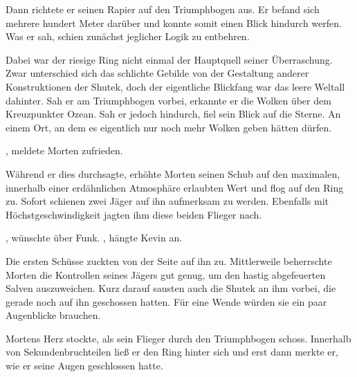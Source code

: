 Dann richtete er seinen Rapier auf den Triumphbogen aus. Er befand sich mehrere hundert Meter darüber und konnte somit einen Blick hindurch werfen. Was er sah, schien zunächst jeglicher Logik zu entbehren.

\par

Dabei war der riesige Ring nicht einmal der Hauptquell seiner Überraschung. Zwar unterschied sich das schlichte Gebilde von der Gestaltung anderer Konstruktionen der Shutek, doch der eigentliche Blickfang war das leere Weltall dahinter. Sah er am Triumphbogen vorbei, erkannte er die Wolken über dem Kreuzpunkter Ozean. Sah er jedoch hindurch, fiel sein Blick auf die Sterne. An einem Ort, an dem es eigentlich nur noch mehr Wolken geben hätten dürfen.

\par

, meldete Morten zufrieden. 

\par

Während er dies durchsagte, erhöhte Morten seinen Schub auf den maximalen, innerhalb einer erdähnlichen Atmosphäre erlaubten Wert und flog auf den Ring zu. Sofort schienen zwei Jäger auf ihn aufmerksam zu werden. Ebenfalls mit Höchstgeschwindigkeit jagten ihm diese beiden Flieger nach.

\par

, wünschte über Funk. , hängte Kevin an.

\par

Die ersten Schüsse zuckten von der Seite auf ihn zu. Mittlerweile beherrschte Morten die Kontrollen seines Jägers gut genug, um den hastig abgefeuerten Salven auszuweichen. Kurz darauf sausten auch die Shutek an ihm vorbei, die gerade noch auf ihn geschossen hatten. Für eine Wende würden sie ein paar Augenblicke brauchen.

\par

Mortens Herz stockte, als sein Flieger durch den Triumphbogen schoss. Innerhalb von Sekundenbruchteilen ließ er den Ring hinter sich und erst dann merkte er, wie er seine Augen geschlossen hatte.


